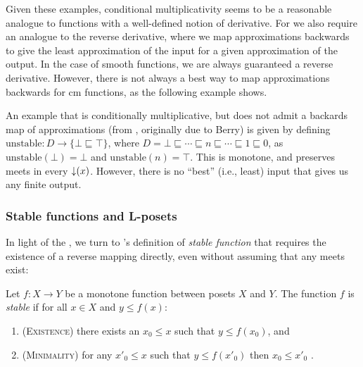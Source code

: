Given these examples, conditional multiplicativity seems to be a
reasonable analogue to functions with a well-defined notion of
derivative. For \GPS we also require an analogue to the reverse
derivative, where we map approximations backwards to give the least
approximation of the input for a given approximation of the output. In
the case of smooth functions, we are always guaranteed a reverse
derivative. However, there is not always a best way to map
approximations backwards for cm functions, as the following example
shows.

\begin{example}
  \label{ex:non-stable-function}
  An example that is conditionally multiplicative, but does not admit
  a backards map of approximations (from \citet[just
  before Lemma 12.2.3]{amadio-curien}, originally due to Berry) is given by defining
  $\mathrm{unstable} : D \to \{\bot \sqsubseteq \top\}$, where
  $D = \bot \sqsubseteq \cdots \sqsubseteq n \sqsubseteq \cdots
  \sqsubseteq 1 \sqsubseteq 0$, as $\mathrm{unstable}(\bot) = \bot$
  and $\mathrm{unstable}(n) = \top$. This is monotone, and preserves
  meets in every $\mathop{\downarrow}(x)$. However, there is no ``best'' (i.e.,
  least) input that gives us any finite output.
\end{example}

\subsubsection{Stable functions and L-posets}
\label{sec:stab}

In light of the , we turn to
\citet{berry79}'s definition of \emph{stable function} that requires
the existence of a reverse mapping directly, even without assuming
that any meets exist:

\begin{definition}
  Let $f : X \to Y$ be a monotone function between posets $X$ and
  $Y$. The function $f$ is \emph{stable} if for all $x \in X$ and
  $y \leq f(x)$:
  \begin{enumerate}
  \item (\textsc{Existence}) there exists an $x_0 \leq x$ such that $y \leq f(x_0)$, and
  \item (\textsc{Minimality}) for any $x'_0 \leq x$ such that $y \leq f(x'_0)$ then
    $x_0 \leq x'_0$ .
  \end{enumerate}
\end{definition}


